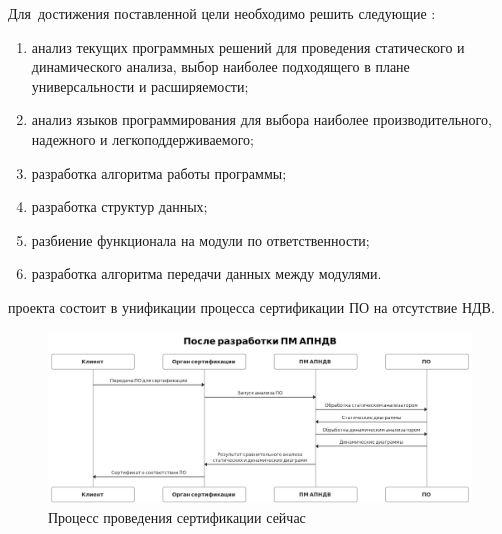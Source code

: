 Для~достижения поставленной цели необходимо решить следующие {\tasks}:
\begin{enumerate}[label={\arabic*)}]
  \item анализ текущих программных решений для проведения 
        статического и динамического анализа, 
        выбор наиболее подходящего в плане универсальности 
        и расширяемости;
  \item анализ языков программирования для выбора наиболее производительного,
        надежного и легкоподдерживаемого;
  \item разработка алгоритма работы программы;
  \item разработка структур данных;
  \item разбиение функционала {\ProgModule} на модули по ответственности;
  \item разработка алгоритма передачи данных между модулями.
\end{enumerate}



{\influence} проекта состоит в унификации процесса сертификации ПО на отсутствие НДВ.

\begin{figure}[!htbp]
    \includegraphics[width=\textwidth,height=\textheight,keepaspectratio]{images/uml_after_cropped.png}
    \caption{Процесс проведения сертификации сейчас\label{fig:how-cert-is-now}}
\end{figure}



